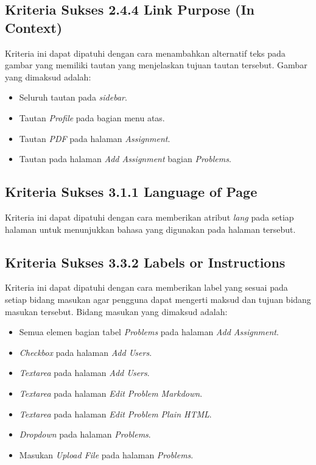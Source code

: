\subsection{Kriteria Sukses 2.4.4 Link Purpose (In Context)}
\label{subsec:peningkatan_A_2.4.4}

Kriteria ini dapat dipatuhi dengan cara menambahkan alternatif teks pada gambar yang memiliki tautan yang menjelaskan tujuan tautan tersebut. Gambar yang dimaksud adalah:

\begin{itemize}
	\item Seluruh tautan pada \textit{sidebar}.
	\item Tautan \textit{Profile} pada bagian menu atas.
	\item Tautan \textit{PDF} pada halaman \textit{Assignment}.
	\item Tautan pada halaman \textit{Add Assignment} bagian \textit{Problems}.
\end{itemize}

\subsection{Kriteria Sukses 3.1.1 Language of Page}
\label{subsec:peningkatan_A_3.1.1}

Kriteria ini dapat dipatuhi dengan cara memberikan atribut \textit{lang} pada setiap halaman untuk menunjukkan bahasa yang digunakan pada halaman tersebut.

\subsection{Kriteria Sukses 3.3.2 Labels or Instructions}
\label{subsec:peningkatan_A_3.3.2}

Kriteria ini dapat dipatuhi dengan cara memberikan label yang sesuai pada setiap bidang masukan agar pengguna dapat mengerti maksud dan tujuan bidang masukan tersebut. Bidang masukan yang dimaksud adalah:

\begin{itemize}
	\item Semua elemen bagian tabel \textit{Problems} pada halaman \textit{Add Assignment}.
	\item \textit{Checkbox} pada halaman \textit{Add Users}.
	\item \textit{Textarea} pada halaman \textit{Add Users}.
	\item \textit{Textarea} pada halaman \textit{Edit Problem Markdown}.
	\item \textit{Textarea} pada halaman \textit{Edit Problem Plain HTML}.
	\item \textit{Dropdown} pada halaman \textit{Problems}.
	\item Masukan \textit{Upload File} pada halaman \textit{Problems}.
\end{itemize}

